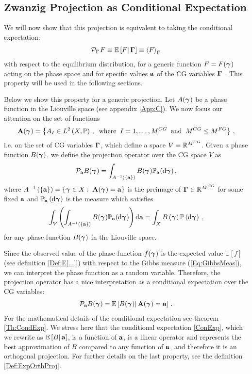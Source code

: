 \documentclass[10pt,a4paper]{book}
\theoremstyle{definition}
\begin{document}
\subsection{Zwanzig Projection as Conditional Expectation}
We will now show that this projection is equivalent to taking the conditional expectation: 
\begin{equation}
\mathcal{P}_{\boldsymbol\Gamma_{}}F \equiv \mathbb{E}\left[ {F} \middle\vert {\,\boldsymbol\Gamma_{}} \right] \equiv \left\langle F\right\rangle_{\boldsymbol\Gamma_{}}
\end{equation}
with respect to the equilibrium distribution, for a generic function $F=F(\boldsymbol\gamma_{})$ acting on the phase space and for specific values $\mathbf{a}$ of the CG variables $\boldsymbol\Gamma_{}$ \cite{Chorin2000,DiPasquale2019}. This property will be used in the following sections.

Below we show this property for a generic projection. Let $A(\boldsymbol\gamma_{})$ be a phase function in the Liouville space (see appendix \ref{App:C}).
We now focus our attention on the set of functions 
$$
\mathbf{A}(\boldsymbol\gamma_{})=\left\lbrace  A_I\in L^2\left(X,\mathbb{P}\right)\,,\;\;\mathrm{where}\;\; I=1,\ldots,M^{CG} \;\;\mathrm{and}\;\; M^{CG}\le M^{FG} \right\rbrace\,,
$$
i.e. on the set of CG variables $\boldsymbol\Gamma_{}$, which define a space $V=\mathbb{R}^{M^{CG}}$. Given a phase function $B(\boldsymbol\gamma_{})$, we define the projection operator over the CG space $V$ as
\begin{equation*}
 \mathcal{P}_{\mathbf{a}}B(\boldsymbol\gamma_{}) = \int_{A^{-1}\left(\left\lbrace \mathbf{a}\right\rbrace\right)}B(\boldsymbol\gamma_{})\mathbb{P}_{\mathbf{a}}(\mbox{d}\boldsymbol\gamma_{})\,,
\end{equation*}
where $A^{-1}\left(\left\lbrace \mathbf{a}\right\rbrace\right)=\left\lbrace \boldsymbol\gamma_{} \in X:\;\mathbf{A}(\boldsymbol\gamma_{})= \mathbf{a}\right\rbrace$ is the preimage of $\boldsymbol\Gamma_{}\in \mathbb{R}^{M^{CG}}$ for some fixed $\mathbf{a}$ and $\mathbb{P}_{\mathbf{a}}\left(\mbox{d} \boldsymbol\gamma_{}\right)$ is the measure which satisfies
$$
\int_V\left(\int_{A^{-1}\left(\left\lbrace \mathbf{a}\right\rbrace\right)}B(\boldsymbol\gamma_{})\mathbb{P}_{\mathbf{a}}(\mbox{d}\boldsymbol\gamma_{})\right)\mbox{d} \mathbf{a} = \int_X B\left(\boldsymbol\gamma_{}\right)\mathbb{P}\left(\mbox{d}\boldsymbol\gamma_{}\right)\,,
$$
for any phase function $B(\boldsymbol\gamma_{})$ in the Liouville space.

Since the observed value of the phase function $f(\boldsymbol\gamma_{})$ is the expected value $\mathbb{E}[f]$ (see definition \ref{Def:E[...]}) with respect to the Gibbs measure (\ref{Eq:GibbsMeas}), we can interpret the phase function as a random variable.  
Therefore, the projection operator has a nice interpretation as a conditional expectation over the CG variables:
\begin{equation}\label{ConExp}
 \mathcal{P}_{\mathbf{a}}B(\boldsymbol\gamma_{}) = \mathbb{E}\left[ {B(\boldsymbol\gamma_{})} \middle\vert {\,\mathbf{A}(\boldsymbol\gamma_{})=\mathbf{a}} \right]\,.
\end{equation}
For the mathematical details of the conditional expectation see theorem \ref{Th:CondExp}. 
We stress here that the conditional expectation \ref{ConExp}, which we rewrite as  $\mathbb{E}\left[ {B} \middle\vert {\,\mathbf{a}} \right]$, is a function of $\mathbf{a}$, is a linear operator and represents the best approximation of $B$ compared to any function of $\mathbf{a}$, and therefore it is an orthogonal projection. For further details on the last property, see the definition \ref{Def:ExpOrthProj}.
\end{document}
